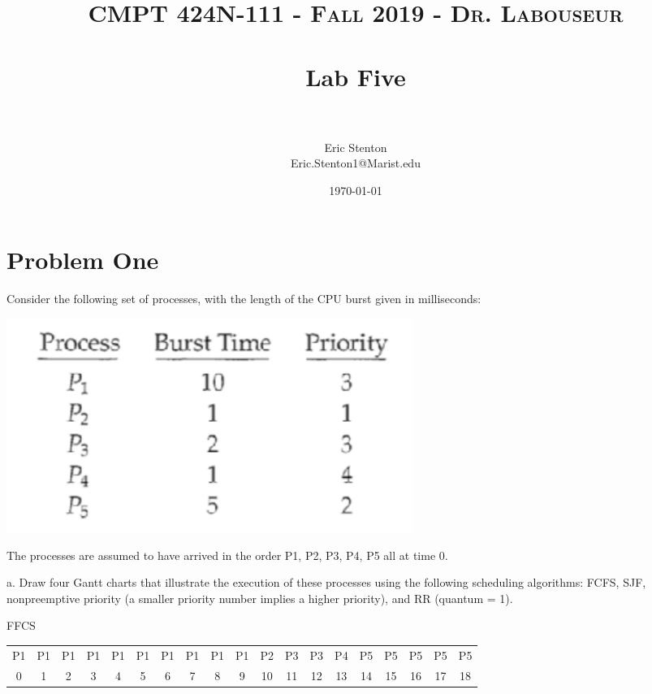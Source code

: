 \documentclass[letterpaper, 10pt,DIV=13]{scrartcl}
\title{	
   \normalfont \normalsize 
   \textsc{CMPT 424N-111 - Fall 2019 - Dr. Labouseur} \\[10pt] %
   \horrule{0.5pt} \\[0.25cm] 	%
   \huge Lab Five  \\     	    %
   \horrule{0.5pt} \\[0.25cm] 	%
}
\author{Eric Stenton \\ \normalsize Eric.Stenton1@Marist.edu}
\date{\normalsize\today} 	%
\numberwithin{equation}{section} %
\numberwithin{figure}{section} %
\numberwithin{table}{section} %
\begin{document}
\maketitle %

\section{Problem One}

Consider the following set of processes, with the length of the CPU burst given in milliseconds:

\begin{center}
\includegraphics[scale=1.5]{processes}
\end{center}

The processes are assumed to have arrived in the order P1, P2, P3, P4, P5 all at time 0.

a. Draw four Gantt charts that illustrate the execution of these processes using the following scheduling algorithms: FCFS, SJF, nonpreemptive priority (a smaller priority number implies a higher priority), and RR (quantum = 1).

\begin{center}
    FFCS
    
    \begin{tabular}{|c|c|c|c|c|c|c|c|c|c|c|c|c|c|c|c|c|c|c|}
        \hline
        P1 & P1 & P1 & P1 & P1 & P1 & P1 & P1 & P1 & P1 & P2 & P3 & P3 & P4 & P5 & P5 & P5 & P5 & P5 \\    
        0 & 1 & 2 & 3 & 4 & 5 & 6 & 7 & 8 & 9 & 10 & 11 & 12 & 13 & 14 & 15 & 16 & 17 & 18 \\

        \hline
    \end{tabular}
\end{center}
\end{document}
